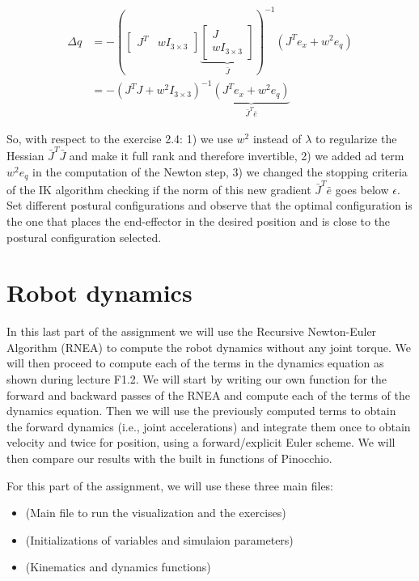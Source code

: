 \documentclass[11pt]{article}
\newcommand{\mat}[1]{\ensuremath{\begin{bmatrix}#1\end{bmatrix}}}	%
\begin{document}
\begin{align*}
\Delta q &= -\left( \mat { J^T &  wI_{3 \times 3} } \underbrace{ \mat{J  \\ wI_{3 \times 3}}}_{\bar{J}} \right)^{-1} \left(J^T e_x + w^2e_q \right) \\
&= -\left( J^TJ + w^2I_{3 \times 3}\right)^{-1} \underbrace{ \left(J^T e_x + w^2 e_q \right) }_{\bar{J}^T\bar{e}}
\end{align*}


So, with respect to the exercise 2.4: 1) we use $w^2$ instead of $\lambda $ to regularize the Hessian $\bar{J}^T\bar{J}$ and make it full rank and therefore invertible, 2) we added ad term $w^2 e_q $ in the computation of the Newton step, 3) we changed the stopping criteria of the IK algorithm checking if the norm of this new gradient $\bar{J}^T\bar{e}$ goes below $\epsilon$.
Set different postural configurations and observe that the optimal configuration is the one that places the end-effector in the desired position and is close to the postural  configuration selected.
\\

\section{Robot dynamics}

In this last part of the assignment we will use the Recursive Newton-Euler Algorithm (RNEA) to compute the robot dynamics without any joint torque. We will then proceed to compute each of the terms in the dynamics equation as shown during lecture F1.2. We will start by writing our own function for the forward and backward passes of the RNEA and compute each of the terms of the dynamics equation. Then we will use the previously computed terms to obtain the forward dynamics (i.e., joint accelerations) and integrate them once to obtain velocity and twice  for position, using a forward/explicit Euler scheme. We will then compare our results with the built in functions of Pinocchio.


For this part of the assignment, we will use these three main files: 
\begin{itemize}
	\item {} (Main file to run the visualization and the exercises)
	\item {} (Initializations of variables and simulaion parameters)
	\item {} (Kinematics and dynamics functions)
\end{itemize}
\end{document}
